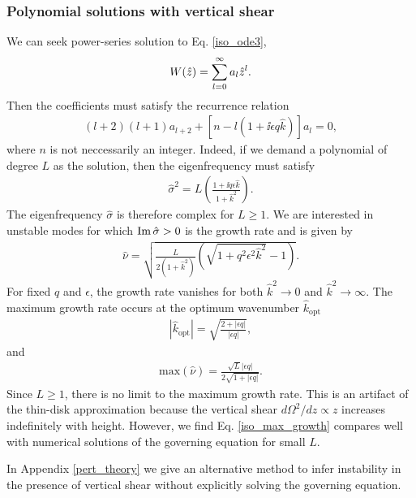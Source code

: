 \subsubsection{Polynomial solutions with vertical shear}\label{iso_poly}
We can seek power-series solution to Eq. \ref{iso_ode3},
\begin{align}
  W(\hat{z}) = \sum_{l=0}^\infty a_l\hat{z}^l. 
\end{align}
Then the coefficients must satisfy the recurrence relation
\begin{align}
  (l+2)(l+1)a_{l+2} +
  \left[n - l\left(1+\ii \epsilon q  \hat{k}\right)\right] a_l = 0, 
\end{align}
where $n$ is not neccessarily an integer. Indeed, if we demand
a polynomial of degree $L$ as the solution, then the eigenfrequency
must satisfy
\begin{align}
\hat{\sigma}^2 = L\left(\frac{1+\ii q \epsilon
    \hat{k}}{1+\hat{k}^2}\right).
\end{align}
The eigenfrequency $\hat{\sigma}$ is therefore complex for
$L\geq1$. We are interested in 
unstable modes for which $\operatorname{Im}{\hat{\sigma}}>0$ is the growth rate and is
given by 
\begin{align}\label{simple_growth}
  \hat{\nu} =\sqrt{
   \frac{L}{2\left(1+\hat{k}^2\right)}\left(\sqrt{1+q^2\epsilon^2\hat{k}^2} - 
    1\right)}. 
\end{align}
For fixed $q$ and $\epsilon$, the growth rate vanishes for both
$\hat{k}^2\to0$ and $\hat{k}^2\to\infty$. The maximum growth rate
occurs at the optimum wavenumber $\hat{k}_\mathrm{opt}$
\begin{align}
  |\hat{k}_\mathrm{opt}| = \sqrt{\frac{2+|\epsilon q|}{|\epsilon q|}},
\end{align}
and
\begin{align}
  \mathrm{max}\left(\hat{\nu}\right) =\frac{\sqrt{L}|\epsilon
    q|}{2\sqrt{1+|\epsilon q|}}. \label{iso_max_growth}
\end{align}
Since $L\geq1$, there is no limit to the maximum growth rate. This is
an artifact of the thin-disk approximation because the vertical 
shear $d\Omega^2/dz\propto z$ increases indefinitely with
height. However, we find Eq. \ref{iso_max_growth} compares well with
numerical solutions of the governing equation for small $L$.      


In Appendix \ref{pert_theory} we give an alternative method to
infer instability in the presence of vertical shear without explicitly
solving the governing equation. 
